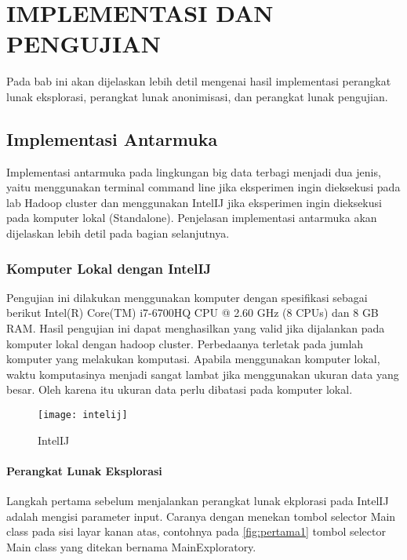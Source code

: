 \def\scl{1}
\def\leg{} 
\def\std{none}
\def\ymin{}
\def\ymax{}

\chapter{IMPLEMENTASI DAN PENGUJIAN}
\label{chap:implementasi_pengujian}

Pada bab ini akan dijelaskan lebih detil mengenai hasil implementasi perangkat lunak eksplorasi, perangkat lunak anonimisasi, dan perangkat lunak pengujian.

\section{Implementasi Antarmuka}
Implementasi antarmuka pada lingkungan big data terbagi menjadi dua jenis, yaitu menggunakan terminal command line jika eksperimen ingin dieksekusi pada lab Hadoop cluster dan menggunakan IntelIJ jika eksperimen ingin dieksekusi pada komputer lokal (Standalone). Penjelasan implementasi antarmuka akan dijelaskan lebih detil pada bagian selanjutnya.


\subsection{Komputer Lokal dengan IntelIJ}
Pengujian ini dilakukan menggunakan komputer dengan spesifikasi sebagai berikut Intel(R) Core(TM) i7-6700HQ CPU @ 2.60 GHz (8 CPUs) dan 8 GB RAM. Hasil pengujian ini dapat menghasilkan yang valid jika dijalankan pada komputer lokal dengan hadoop cluster. Perbedaanya terletak pada jumlah komputer yang melakukan komputasi. Apabila menggunakan komputer lokal, waktu komputasinya menjadi sangat lambat jika menggunakan ukuran data yang besar. Oleh karena itu ukuran data perlu dibatasi pada komputer lokal.

\begin{figure}[H]
	\centering
	\texttt{[image: intelij]}
	\caption{IntelIJ}
	\label{fig:pertama0}
\end{figure}


\subsubsection{Perangkat Lunak Eksplorasi}
Langkah pertama sebelum menjalankan perangkat lunak ekplorasi pada IntelIJ adalah mengisi parameter input. Caranya dengan menekan tombol selector Main class pada sisi layar kanan atas, contohnya pada \ref{fig:pertama1} tombol selector Main class yang ditekan bernama MainExploratory. 

